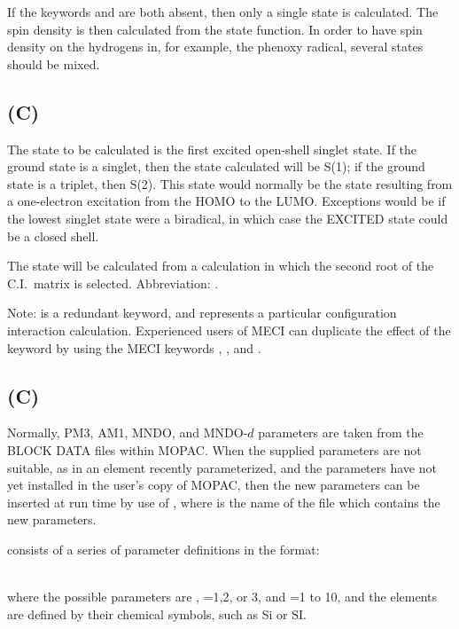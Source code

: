 If  the  keywords    and    are  both
absent, then only a single state is
calculated.  The spin density is then calculated from the  state
function.   In  order  to have spin density on the hydrogens in,
for example, the phenoxy radical, several states should be mixed.

\subsection*{ (C)}
The state to be calculated is the first excited  open-shell  singlet
state.   If the ground state is a singlet, then the state calculated will
be S(1); if the ground state is a triplet, then S(2).  This  state  would
normally  be  the state resulting from a one-electron excitation from the
HOMO to the LUMO.  Exceptions would be if the lowest singlet state were a
biradical, in which case the EXCITED state could be a closed shell.

The  state will be calculated from a  calculation in
which  the  second  root  of  the C.I.\ matrix is selected.
Abbreviation:  .

Note:   is a redundant keyword, and represents  a  particular
configuration  interaction  calculation.   Experienced  users of MECI can
duplicate the effect of the keyword  by using  the  MECI  keywords
, , and .

\subsection*{ (C)}
\label{external}
Normally, PM3, AM1, MNDO, and MNDO-$d$  parameters are taken from
the BLOCK DATA
files within MOPAC.  When the supplied parameters are not suitable, as in
an element recently  parameterized,  and  the  parameters  have  not  yet
installed  in  the  user's  copy of MOPAC, then the new parameters can be
inserted at run time by use of , where
 is the name of the file which contains the new parameters.

 consists of a series  of  parameter  definitions  in  the
format:

\\
where the possible parameters are , =1,2, or 3,
and =1 to
10, and the elements are defined by their chemical symbols, such as Si or
SI.

